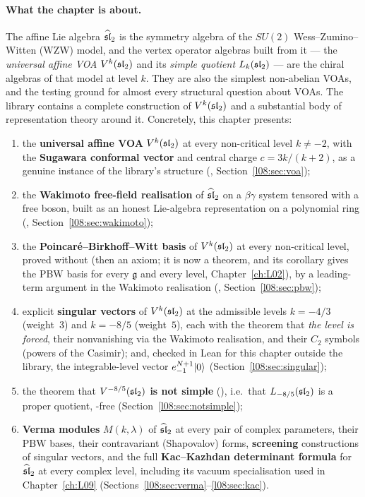 \paragraph{What the chapter is about.}
The affine Lie algebra $\widehat{\mathfrak{sl}}_2$ is the symmetry algebra of the $SU(2)$ Wess--Zumino--Witten
(WZW) model, and the vertex operator algebras built from it --- the \emph{universal affine VOA}
$V^k(\mathfrak{sl}_2)$ and its \emph{simple quotient} $L_k(\mathfrak{sl}_2)$ --- are the chiral algebras of that
model at level $k$. They are also the simplest non-abelian VOAs, and the testing ground for almost
every structural question about VOAs. The library contains a complete construction of
$V^k(\mathfrak{sl}_2)$ and a substantial body of representation theory around it. Concretely, this chapter
presents:
\begin{enumerate}
\item the \textbf{universal affine VOA} $V^k(\mathfrak{sl}_2)$ at every non-critical level $k\neq-2$, with
  the \textbf{Sugawara conformal vector} and central charge $c = 3k/(k+2)$, as a genuine instance
  of the library's  structure (\allowbreak{}\allowbreak{},
  Section~\ref{l08:sec:voa});
\item the \textbf{Wakimoto free-field realisation} of $\widehat{\mathfrak{sl}}_2$ on a $\beta\gamma$ system tensored
  with a free boson, built as an honest Lie-algebra representation on a polynomial ring
  (, Section~\ref{l08:sec:wakimoto});
\item the \textbf{Poincar\'e--Birkhoff--Witt basis} of $V^k(\mathfrak{sl}_2)$ at every non-critical level,
  proved without  (then an axiom; it is now a theorem, and its corollary  gives the PBW
  basis for every $\mathfrak g$ and every level, Chapter~\ref{ch:L02}), by a leading-term argument in the Wakimoto
  realisation (\allowbreak{}, Section~\ref{l08:sec:pbw});
\item explicit \textbf{singular vectors} of $V^k(\mathfrak{sl}_2)$ at the admissible levels $k=-4/3$
  (weight~$3$) and $k=-8/5$ (weight~$5$), each with the theorem that \emph{the level is forced},
  their nonvanishing via the Wakimoto realisation, and their $C_2$ symbols (powers of the Casimir);
  and, checked in Lean for this chapter outside the library, the integrable-level vector
  $e_{-1}^{N+1}|0\rangle$ (Section~\ref{l08:sec:singular});
\item the theorem that \textbf{$V^{-8/5}(\mathfrak{sl}_2)$ is not simple} (\allowbreak{}\allowbreak{}\allowbreak{}),
  i.e.\ that $L_{-8/5}(\mathfrak{sl}_2)$ is a proper quotient, -free (Section~\ref{l08:sec:notsimple});
\item \textbf{Verma modules} $M(k,\lambda)$ of $\widehat{\mathfrak{sl}}_2$ at every pair of complex parameters, their
  PBW bases, their contravariant (Shapovalov) forms, \textbf{screening} constructions of singular
  vectors, and the full \textbf{Kac--Kazhdan determinant formula} for $\widehat{\mathfrak{sl}}_2$ at every complex
  level, including its vacuum specialisation used in Chapter~\ref{ch:L09}
  (Sections~\ref{l08:sec:verma}--\ref{l08:sec:kac}).
\end{enumerate}

